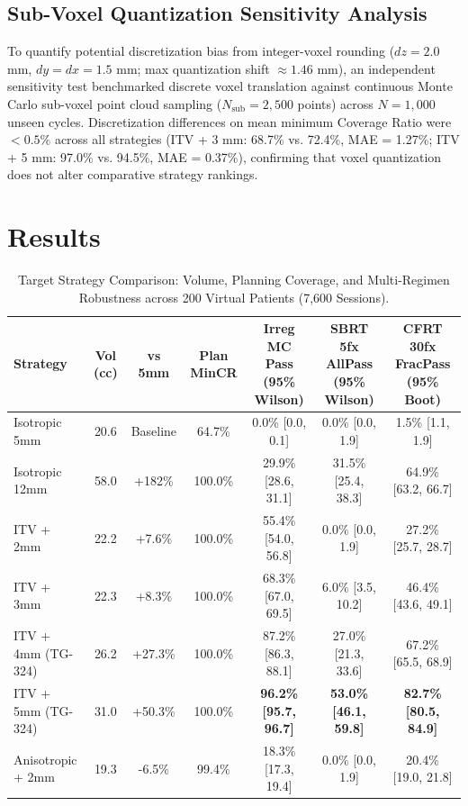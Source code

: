 \documentclass[10pt,twocolumn]{article}
\begin{document}
\subsection{Sub-Voxel Quantization Sensitivity Analysis}
To quantify potential discretization bias from integer-voxel rounding ($dz=2.0$ mm, $dy=dx=1.5$ mm; max quantization shift $\approx 1.46$ mm), an independent sensitivity test benchmarked discrete voxel translation against continuous Monte Carlo sub-voxel point cloud sampling ($N_{\text{sub}} = 2,500$ points) across $N = 1,000$ unseen cycles. Discretization differences on mean minimum Coverage Ratio were $< 0.5\%$ across all strategies (ITV + 3 mm: 68.7\% vs. 72.4\%, MAE = 1.27\%; ITV + 5 mm: 97.0\% vs. 94.5\%, MAE = 0.37\%), confirming that voxel quantization does not alter comparative strategy rankings.

\section{Results}
\begin{table}[t]
\centering
\caption{Target Strategy Comparison: Volume, Planning Coverage, and Multi-Regimen Robustness across 200 Virtual Patients (7,600 Sessions).}
\small
\begin{tabular}{lcccccc}
\toprule
Strategy & Vol (cc) & vs 5mm & Plan MinCR & Irreg MC Pass (95\% Wilson) & SBRT 5fx AllPass (95\% Wilson) & CFRT 30fx FracPass (95\% Boot) \\
\midrule
Isotropic 5mm & 20.6 & Baseline & 64.7\% & 0.0\% [0.0, 0.1] & 0.0\% [0.0, 1.9] & 1.5\% [1.1, 1.9] \\
Isotropic 12mm & 58.0 & +182\% & 100.0\% & 29.9\% [28.6, 31.1] & 31.5\% [25.4, 38.3] & 64.9\% [63.2, 66.7] \\
ITV + 2mm & 22.2 & +7.6\% & 100.0\% & 55.4\% [54.0, 56.8] & 0.0\% [0.0, 1.9] & 27.2\% [25.7, 28.7] \\
ITV + 3mm & 22.3 & +8.3\% & 100.0\% & 68.3\% [67.0, 69.5] & 6.0\% [3.5, 10.2] & 46.4\% [43.6, 49.1] \\
ITV + 4mm (TG-324) & 26.2 & +27.3\% & 100.0\% & 87.2\% [86.3, 88.1] & 27.0\% [21.3, 33.6] & 67.2\% [65.5, 68.9] \\
ITV + 5mm (TG-324) & 31.0 & +50.3\% & 100.0\% & \textbf{96.2\% [95.7, 96.7]} & \textbf{53.0\% [46.1, 59.8]} & \textbf{82.7\% [80.5, 84.9]} \\
Anisotropic + 2mm & 19.3 & -6.5\% & 99.4\% & 18.3\% [17.3, 19.4] & 0.0\% [0.0, 1.9] & 20.4\% [19.0, 21.8] \\
\bottomrule
\end{tabular}
\end{table}
\end{document}
